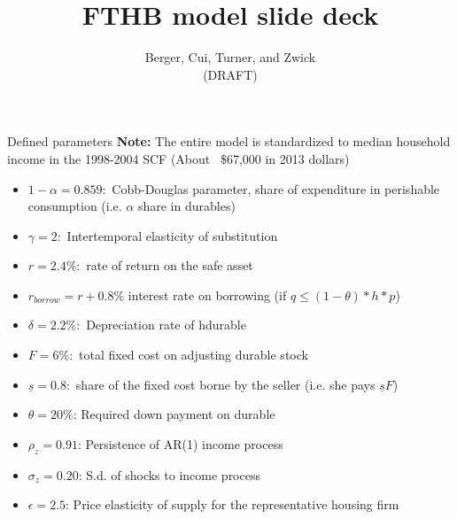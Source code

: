 \documentclass[9pt]{beamer}
\title{FTHB model slide deck}
\author{Berger, Cui, Turner, and Zwick \\ (DRAFT)}
\begin{document}
\begin{frame}
\titlepage
\end{frame}

{
}

\begin{frame}{Defined parameters}
\textbf{Note:} The entire model is standardized to median household income
 in the 1998-2004 SCF (About ~\$67,000 in 2013 dollars)
\begin{itemize}
        \item $1-\alpha = 0.859:$ Cobb-Douglas parameter, share of expenditure
                in perishable consumption (i.e. $\alpha$ share in durables)
        \item $\gamma = 2:$ Intertemporal elasticity of substitution
        \item $r = 2.4\%:$ rate of return on the safe asset
        \item $r_{borrow} = r + 0.8\%$ interest rate on borrowing (if
                $q \leq (1-\theta)*h*p$)
        \item $\delta = 2.2\%:$ Depreciation rate of hdurable
        \item $F = 6\%:$ total fixed cost on adjusting durable stock
        \item $\underline{s} = 0.8:$ share of the fixed cost borne by the
                seller (i.e. she pays $\underline{s}F$)
        \item $\theta = 20\%$: Required down payment on durable
        \item $\rho_z = 0.91$: Persistence of AR(1) income process
        \item $\sigma_z = 0.20$: S.d. of shocks to income process
        \item $\epsilon = 2.5$: Price elasticity of supply for the representative
               housing firm
\end{itemize}
\end{frame}
\end{document}
